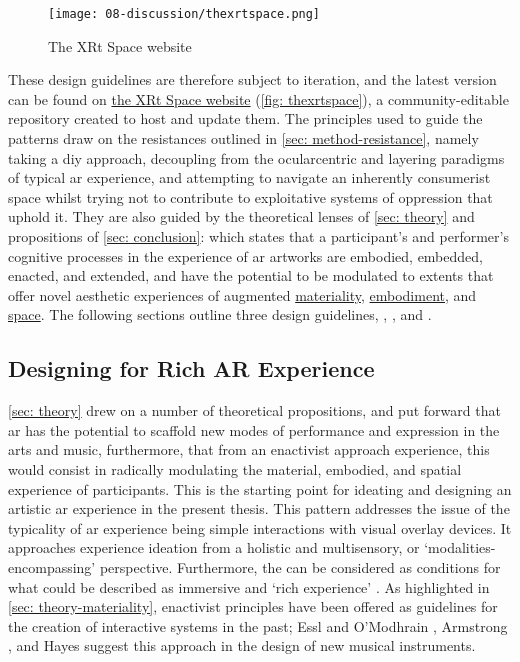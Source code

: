 \begin{figure}
    \centering
    {\texttt{[image: 08-discussion/thexrtspace.png]}}
    \caption[The XRt Space website]{The XRt Space website}
\end{figure}\label{fig: thexrtspace}

These design guidelines are therefore subject to iteration, and the latest version can be found on \href{https://sambilbow.github.io/thexrtspace}{the XRt Space website} (\autoref{fig: thexrtspace}), a community-editable repository created to host and update them. The principles used to guide the patterns draw on the resistances outlined in \autoref{sec: method-resistance}, namely taking a \gls{diy} approach, decoupling from the ocularcentric and layering paradigms of typical \gls{ar} experience, and attempting to navigate an inherently consumerist space whilst trying not to contribute to exploitative systems of oppression that uphold it. They are also guided by the theoretical lenses of \autoref{sec: theory} and propositions of \autoref{sec: conclusion}: which states that a participant's and performer's cognitive processes in the experience of \gls{ar} artworks are embodied, embedded, enacted, and extended, and have the potential to be modulated to extents that offer novel aesthetic experiences of augmented \hyperref[sec: discussion-medium-material]{materiality}, \hyperref[sec: discussion-medium-embodiment]{embodiment}, and \hyperref[sec: discussion-medium-space]{space}. The following sections outline three design guidelines, \textit{}, \textit{}, and \textit{}.

\subsection{Designing for Rich AR Experience}\label{sec: discussion-guidelines-experience} 
\autoref{sec: theory} drew on a number of theoretical propositions, and put forward that \gls{ar} has the potential to scaffold new modes of performance and expression in the arts and music, furthermore, that from an enactivist approach experience, this would consist in radically modulating the material, embodied, and spatial experience of participants. This is the starting point for ideating and designing an artistic \gls{ar} experience in the present thesis. This pattern addresses the issue of the typicality of \gls{ar} experience being simple interactions with visual overlay devices. It approaches experience ideation from a holistic and multisensory, or `modalities-encompassing' \citep{schraffenberger2018} perspective. Furthermore, the  can be considered as conditions for what could be described as immersive and `rich experience' \citep{bilbow2021}. As highlighted in \autoref{sec: theory-materiality}, enactivist principles have been offered as guidelines for the creation of interactive systems in the past; Essl and O'Modhrain \citeyearpar{essl2006}, Armstrong \citeyearpar{armstrong2006}, and Hayes \citeyearpar{hayes2019} suggest this approach in the design of new musical instruments. 

